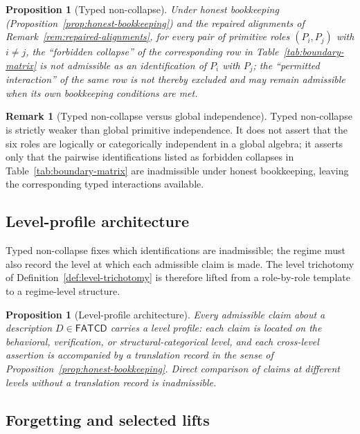 \documentclass[11pt]{article}
\newtheorem{proposition}[theorem]{Proposition}
\theoremstyle{definition}
\newtheorem{remark}[theorem]{Remark}
\newcommand{\FATCD}{\ensuremath{\mathsf{FATCD}}}
\begin{document}
\begin{proposition}[Typed non-collapse]\label{prop:typed-non-collapse}
Under honest bookkeeping (Proposition~\ref{prop:honest-bookkeeping}) and
the repaired alignments of Remark~\ref{rem:repaired-alignments}, for
every pair of primitive roles \((P_i, P_j)\) with \(i \ne j\), the
``forbidden collapse'' of the corresponding row in
Table~\ref{tab:boundary-matrix} is not admissible as an identification
of \(P_i\) with \(P_j\); the ``permitted interaction'' of the same row is
not thereby excluded and may remain admissible when its own bookkeeping
conditions are met.
\end{proposition}

\begin{remark}[Typed non-collapse versus global independence]\label{rem:typed-non-collapse-vs-independence}
Typed non-collapse is strictly weaker than global primitive
independence. It does not assert that the six roles are logically or
categorically independent in a global algebra; it asserts only that
the pairwise identifications listed as forbidden collapses in
Table~\ref{tab:boundary-matrix} are inadmissible under honest
bookkeeping, leaving the corresponding typed interactions available.
\end{remark}


\subsection{Level-profile architecture}\label{subsec:level-profile-architecture}

Typed non-collapse fixes which identifications are inadmissible; the
regime must also record the level at which each admissible claim is
made. The level trichotomy of Definition~\ref{def:level-trichotomy}
is therefore lifted from a role-by-role template to a regime-level
structure.

\begin{proposition}[Level-profile architecture]\label{prop:level-profile}
Every admissible claim about a description \(D \in \FATCD{}\) carries a
level profile: each claim is located on the behavioral, verification, or
structural-categorical level, and each cross-level assertion is
accompanied by a translation record in the sense of
Proposition~\ref{prop:honest-bookkeeping}. Direct comparison of claims at
different levels without a translation record is inadmissible.
\end{proposition}

\subsection{Forgetting and selected lifts}\label{subsec:forgetting-lifts}
\end{document}

